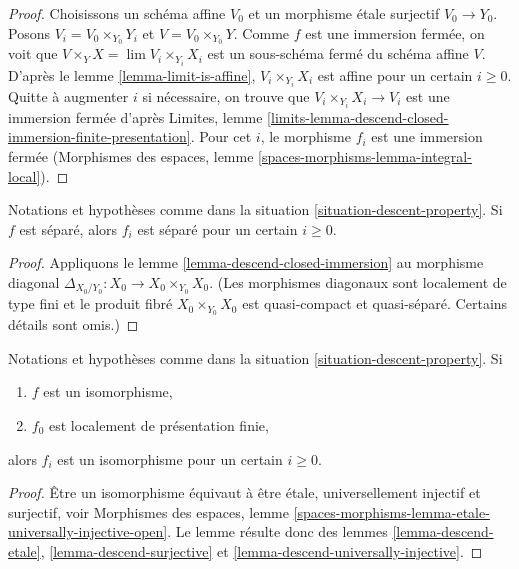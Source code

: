 \begin{proof}
Choisissons un schéma affine $V_0$ et un morphisme étale surjectif $V_0 \to Y_0$.
Posons $V_i = V_0 \times_{Y_0} Y_i$ et $V = V_0 \times_{Y_0} Y$.
Comme $f$ est une immersion fermée, on voit que
$V \times_Y X = \lim V_i \times_{Y_i} X_i$
est un sous-schéma fermé du schéma affine $V$. D'après le
lemme \ref{lemma-limit-is-affine},
$V_i \times_{Y_i} X_i$ est affine pour un certain $i \geq 0$. Quitte à augmenter $i$ si
nécessaire, on trouve que $V_i \times_{Y_i} X_i \to V_i$ est une immersion fermée d'après
Limites, lemme \ref{limits-lemma-descend-closed-immersion-finite-presentation}.
Pour cet $i$, le morphisme $f_i$ est une immersion fermée
(Morphismes des espaces, lemme \ref{spaces-morphisms-lemma-integral-local}).
\end{proof}

\begin{lemma}
\label{lemma-descend-separated-morphism}
Notations et hypothèses comme dans la situation \ref{situation-descent-property}.
Si $f$ est séparé, alors $f_i$ est séparé pour un certain $i \geq 0$.
\end{lemma}

\begin{proof}
Appliquons le lemme \ref{lemma-descend-closed-immersion}
au morphisme diagonal $\Delta_{X_0/Y_0} : X_0 \to X_0 \times_{Y_0} X_0$.
(Les morphismes diagonaux sont localement de type fini
et le produit fibré $X_0 \times_{Y_0} X_0$ est quasi-compact et
quasi-séparé. Certains détails sont omis.)
\end{proof}

\begin{lemma}
\label{lemma-descend-isomorphism}
Notations et hypothèses comme dans la situation \ref{situation-descent-property}. Si
\begin{enumerate}
\item $f$ est un isomorphisme,
\item $f_0$ est localement de présentation finie,
\end{enumerate}
alors $f_i$ est un isomorphisme pour un certain $i \geq 0$.
\end{lemma}

\begin{proof}
Être un isomorphisme équivaut à être étale, universellement injectif
et surjectif, voir
Morphismes des espaces, lemme
\ref{spaces-morphisms-lemma-etale-universally-injective-open}.
Le lemme résulte donc des
lemmes \ref{lemma-descend-etale},
\ref{lemma-descend-surjective} et
\ref{lemma-descend-universally-injective}.
\end{proof}

